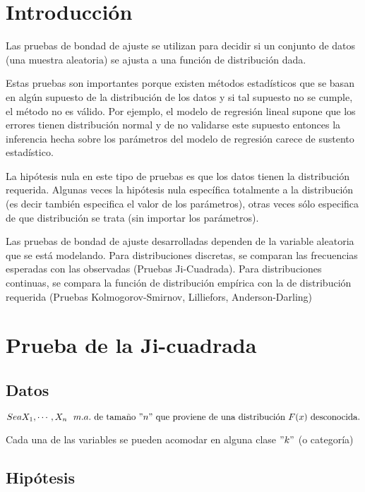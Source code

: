 \documentclass[
  a4paper,
  oneside,
  openany]{book}
\begin{document}
\hypertarget{introducciuxf3n-4}{%
\chapter*{Introducción}\label{introducciuxf3n-4}}


Las pruebas de bondad de ajuste se utilizan para decidir si un conjunto de datos (una muestra aleatoria) se ajusta a una función de distribución dada.

Estas pruebas son importantes porque existen métodos estadísticos que se basan en algún supuesto de la distribución de los datos y si tal supuesto no se cumple, el método no es válido. Por ejemplo, el modelo de regresión lineal supone que los errores tienen distribución normal y de no validarse este supuesto entonces la inferencia hecha sobre los parámetros del modelo de regresión carece de sustento estadístico.

La hipótesis nula en este tipo de pruebas es que los datos tienen la distribución requerida. Algunas veces la hipótesis nula específica totalmente a la distribución (es decir también especifica el valor de los parámetros), otras veces sólo especifica de que distribución se trata (sin importar los parámetros).

Las pruebas de bondad de ajuste desarrolladas dependen de la variable aleatoria que se está modelando. Para distribuciones discretas, se comparan las frecuencias esperadas con las observadas (Pruebas Ji-Cuadrada). Para distribuciones continuas, se compara la función de distribución empírica con la de distribución requerida (Pruebas Kolmogorov-Smirnov, Lilliefors, Anderson-Darling)

\hypertarget{prueba-de-la-ji-cuadrada}{%
\chapter{Prueba de la Ji-cuadrada}\label{prueba-de-la-ji-cuadrada}}

\hypertarget{datos-14}{%
\section{Datos}\label{datos-14}}

\[ Sea X_{1},\cdots,X_{n} \ \ m.a. \  \mbox{de tamaño} \  "n"\  \mbox{que proviene de una distribución} \  F(x) \  \mbox{desconocida.}\]

Cada una de las variables se pueden acomodar en alguna clase \("k"\) (o categoría)

\hypertarget{hipuxf3tesis-12}{%
\section{Hipótesis}\label{hipuxf3tesis-12}}
\end{document}
